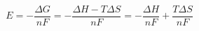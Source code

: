 \documentclass[preview]{standalone}
\begin{document}
\[E = -\frac{\Delta G}{nF} = -\frac{\Delta H - T\Delta S}{nF} = -\frac{\Delta H}{nF} + \frac{T\Delta S}{nF} \tag{1.16}\]
\end{document}
